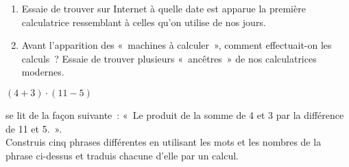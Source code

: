 \begin{exercice}
 \begin{enumerate}
  \item Essaie de trouver sur Internet à quelle date est apparue la première calculatrice ressemblant à celles qu'on utilise de nos jours.
  \item Avant l'apparition des « machines à calculer », comment effectuait-on les calculs ? Essaie de trouver plusieurs « ancêtres » de nos calculatrices modernes.
  \end{enumerate}
\end{exercice}


\begin{exercice}
\begin{center} $(4 + 3) \cdot (11 - 5)$ \end{center}
se lit de la façon suivante : « Le produit de la somme de 4 et 3 par la différence de 11 et 5. ». \\[0.75em]
Construis cinq phrases différentes en utilisant les mots et les nombres de la phrase ci-dessus et traduis chacune d’elle par un calcul.
\end{exercice}


